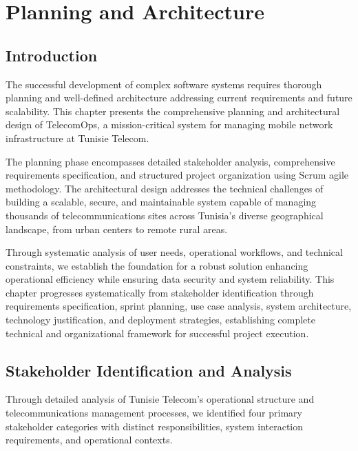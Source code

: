 \newpage

\chapter{Planning and Architecture}

\cfoot{\thepage}

\parindent=0.5in
\onehalfspacing

\section{Introduction}

The successful development of complex software systems requires thorough planning and well-defined architecture addressing current requirements and future scalability. This chapter presents the comprehensive planning and architectural design of TelecomOps, a mission-critical system for managing mobile network infrastructure at Tunisie Telecom.

The planning phase encompasses detailed stakeholder analysis, comprehensive requirements specification, and structured project organization using Scrum agile methodology. The architectural design addresses the technical challenges of building a scalable, secure, and maintainable system capable of managing thousands of telecommunications sites across Tunisia's diverse geographical landscape, from urban centers to remote rural areas.

Through systematic analysis of user needs, operational workflows, and technical constraints, we establish the foundation for a robust solution enhancing operational efficiency while ensuring data security and system reliability. This chapter progresses systematically from stakeholder identification through requirements specification, sprint planning, use case analysis, system architecture, technology justification, and deployment strategies, establishing complete technical and organizational framework for successful project execution.

\section{Stakeholder Identification and Analysis}

Through detailed analysis of Tunisie Telecom's operational structure and telecommunications management processes, we identified four primary stakeholder categories with distinct responsibilities, system interaction requirements, and operational contexts.

